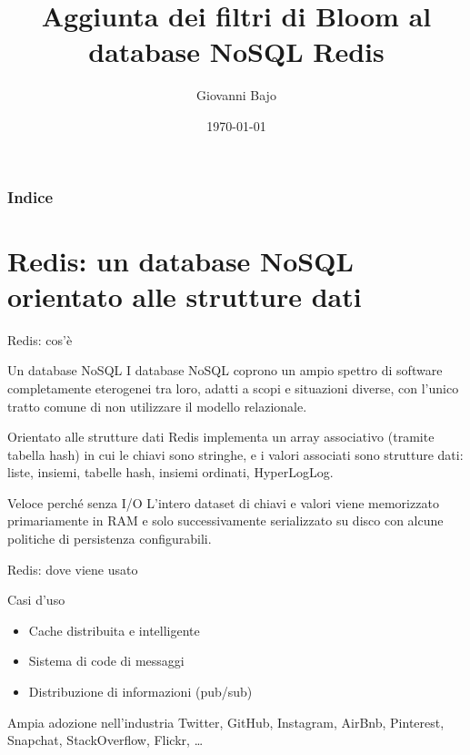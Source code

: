 \documentclass{beamer}
\title{Aggiunta dei filtri di Bloom al database NoSQL Redis}
\date{\today}
\author{Giovanni Bajo}
\institute{Università agli Studi di Firenze - Dipartimento di Informatica}
\begin{document}
 	\maketitle

 	\begin{frame}
	  	\frametitle{Indice}
		\tableofcontents
	\end{frame}













	\section{Redis: un database NoSQL orientato alle strutture dati}

	\begin{frame}{Redis: cos'è}
	  	\begin{block}{Un database NoSQL}
	    I database NoSQL coprono un ampio spettro di software completamente eterogenei tra loro, adatti a scopi e situazioni diverse, con l'unico tratto comune di non utilizzare il modello relazionale.
	  	\end{block}

	  	\begin{block}{Orientato alle strutture dati}
		Redis implementa un array associativo (tramite tabella hash) in cui le
chiavi sono stringhe, e i valori associati sono strutture dati: liste, insiemi, tabelle hash,
insiemi ordinati, HyperLogLog.
	  	\end{block}	

	  	\begin{block}{Veloce perché senza I/O}
L'intero dataset di chiavi e valori viene memorizzato primariamente in RAM e solo
successivamente serializzato su disco con alcune politiche di persistenza
configurabili.
		\end{block}
	\end{frame}

	\begin{frame}{Redis: dove viene usato}
	  	\begin{block}{Casi d'uso}
	  	\begin{itemize}
	  		\item Cache distribuita e intelligente
	  		\item Sistema di code di messaggi
	  		\item Distribuzione di informazioni (pub/sub)
	  	\end{itemize}
	  	\end{block}

	  	\begin{block}{Ampia adozione nell'industria}
	  	Twitter, GitHub, Instagram, AirBnb, Pinterest, Snapchat, StackOverflow, Flickr, \dots
	  	\end{block}
	\end{frame}
\end{document}
